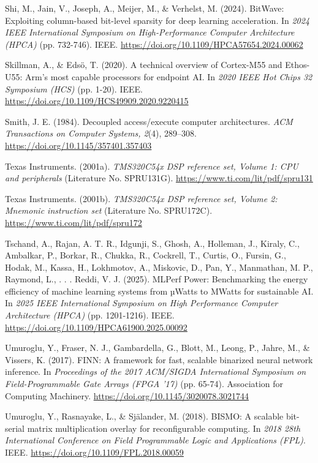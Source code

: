 \begin{apareferences}
Shi, M., Jain, V., Joseph, A., Meijer, M., \& Verhelst, M. (2024). BitWave: Exploiting column-based bit-level sparsity for deep learning acceleration. In \emph{2024 IEEE International Symposium on High-Performance Computer Architecture (HPCA)} (pp. 732-746). IEEE. \url{https://doi.org/10.1109/HPCA57654.2024.00062}

Skillman, A., \& Edsö, T. (2020). A technical overview of Cortex-M55 and Ethos-U55: Arm's most capable processors for endpoint AI. In \emph{2020 IEEE Hot Chips 32 Symposium (HCS)} (pp. 1-20). IEEE. \url{https://doi.org/10.1109/HCS49909.2020.9220415}

Smith, J. E. (1984). Decoupled access/execute computer architectures. \emph{ACM Transactions on Computer Systems, 2}(4), 289–308. \url{https://doi.org/10.1145/357401.357403}

Texas Instruments. (2001a). \emph{TMS320C54x DSP reference set, Volume 1: CPU and peripherals} (Literature No. SPRU131G). \url{https://www.ti.com/lit/pdf/spru131}

Texas Instruments. (2001b). \emph{TMS320C54x DSP reference set, Volume 2: Mnemonic instruction set} (Literature No. SPRU172C). \url{https://www.ti.com/lit/pdf/spru172}

Tschand, A., Rajan, A. T. R., Idgunji, S., Ghosh, A., Holleman, J., Kiraly, C., Ambalkar, P., Borkar, R., Chukka, R., Cockrell, T., Curtis, O., Fursin, G., Hodak, M., Kassa, H., Lokhmotov, A., Miskovic, D., Pan, Y., Manmathan, M. P., Raymond, L., . . . Reddi, V. J. (2025). MLPerf Power: Benchmarking the energy efficiency of machine learning systems from µWatts to MWatts for sustainable AI. In \emph{2025 IEEE International Symposium on High Performance Computer Architecture (HPCA)} (pp. 1201-1216). IEEE. \url{https://doi.org/10.1109/HPCA61900.2025.00092}

Umuroglu, Y., Fraser, N. J., Gambardella, G., Blott, M., Leong, P., Jahre, M., \& Vissers, K. (2017). FINN: A framework for fast, scalable binarized neural network inference. In \emph{Proceedings of the 2017 ACM/SIGDA International Symposium on Field-Programmable Gate Arrays (FPGA '17)} (pp. 65-74). Association for Computing Machinery. \url{https://doi.org/10.1145/3020078.3021744}

Umuroglu, Y., Rasnayake, L., \& Själander, M. (2018). BISMO: A scalable bit-serial matrix multiplication overlay for reconfigurable computing. In \emph{2018 28th International Conference on Field Programmable Logic and Applications (FPL)}. IEEE. \url{https://doi.org/10.1109/FPL.2018.00059}


\end{apareferences}
